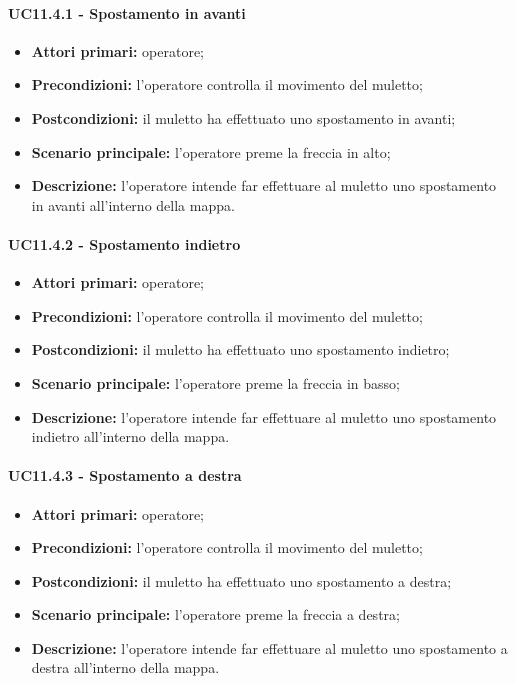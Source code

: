 \paragraph{UC11.4.1 - Spostamento in avanti}
\begin{itemize}
	\item 	\textbf{Attori primari:} operatore;
	\item 	\textbf{Precondizioni:} l’operatore controlla il movimento del muletto;
	\item 	\textbf{Postcondizioni:} il muletto ha effettuato uno spostamento in avanti; 
	\item 	\textbf{Scenario principale:} l’operatore preme la freccia in alto;
	\item 	\textbf{Descrizione:} l’operatore intende far effettuare al muletto uno spostamento in avanti all’interno della mappa.

\end{itemize}

\paragraph{UC11.4.2 - Spostamento indietro}
\begin{itemize}
	\item 	\textbf{Attori primari:} operatore;
	\item 	\textbf{Precondizioni:} l’operatore controlla il movimento del muletto;
	\item 	\textbf{Postcondizioni:} il muletto ha effettuato uno spostamento indietro; 
	\item 	\textbf{Scenario principale:} l’operatore preme la freccia in basso;
	\item 	\textbf{Descrizione:} l’operatore intende far effettuare al muletto uno spostamento indietro all’interno della mappa.
\end{itemize}

\paragraph{UC11.4.3 - Spostamento a destra}
\begin{itemize}
	\item 	\textbf{Attori primari:} operatore;
	\item 	\textbf{Precondizioni:} l’operatore controlla il movimento del muletto;
	\item 	\textbf{Postcondizioni:} il muletto ha effettuato uno spostamento a destra; 
	\item 	\textbf{Scenario principale:} l’operatore preme la freccia a destra;
	\item 	\textbf{Descrizione:} l’operatore intende far effettuare al muletto uno spostamento a destra all’interno della mappa.

\end{itemize}

